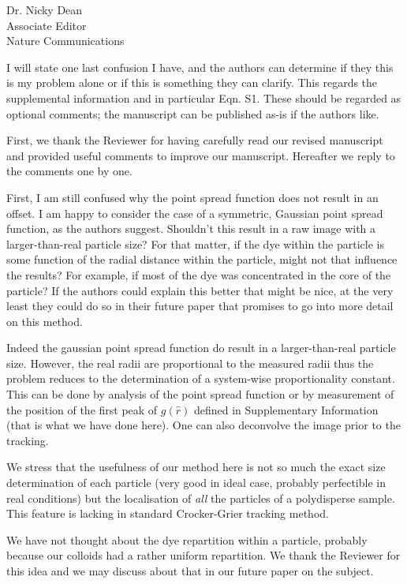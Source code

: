 \documentclass[a4paper, rebuttal, parskip=true, firsthead=false, fromemail=true, foldmarks=false]{scrlttr2}
\begin{document}
\begin{letter}{Dr. Nicky Dean\\
Associate Editor\\
Nature Communications}
\begin{quotationi}
I will state one last confusion I have, and the authors can determine if they this is my problem alone or if this is something they can clarify. This regards the supplemental information and in particular Eqn. S1. These should be regarded as optional comments; the manuscript can be published as-is if the authors like.
\end{quotationi}

First, we thank the Reviewer for having carefully read our revised manuscript and provided useful comments to improve our manuscript. Hereafter we reply to the comments one by one.

\begin{quotationi}
First, I am still confused why the point spread function does not result in an offset. I am happy to consider the case of a symmetric, Gaussian point spread function, as the authors suggest. Shouldn't this result in a raw image with a larger-than-real particle size? For that matter, if the dye within the particle is some function of the radial distance within the particle, might not that influence the results? For example, if most of the dye was concentrated in the core of the particle? If the authors could explain this better that might be nice, at the very least they could do so in their future paper that promises to go into more detail on this method.
\end{quotationi}

Indeed the gaussian point spread function do result in a larger-than-real particle size. However, the real radii are proportional to the measured radii thus the problem reduces to the determination of a system-wise proportionality constant. This can be done by analysis of the point spread function or by measurement of the position of the first peak of $g(\hat{r})$ defined in Supplementary Information (that is what we have done here). One can also deconvolve the image prior to the tracking.

We stress that the usefulness of our method here is not so much the exact size determination of each particle (very good in ideal case, probably perfectible in real conditions) but the localisation of \emph{all} the particles of a polydisperse sample. This feature is lacking in standard Crocker-Grier tracking method.

We have not thought about the dye repartition within a particle, probably because our colloids had a rather uniform repartition. We thank the Reviewer for this idea and we may discuss about that in our future paper on the subject.


\end{letter}
\end{document}
